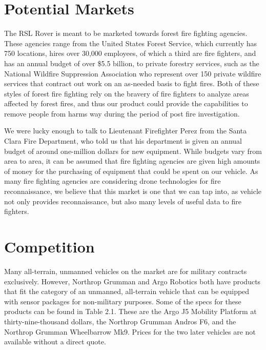 \section{Potential Markets}

The RSL Rover is meant to be marketed towards forest fire fighting agencies. These agencies range from the United States Forest Service, which currently has 750 locations, hires over 30,000 employees, of which a third are fire fighters, and has an annual budget of over \$5.5 billion, to private forestry services, such as the National Wildfire Suppression Association who represent over 150 private wildfire services that contract out work on an as-needed basis to fight fires. Both of these styles of forest fire fighting rely on the bravery of fire fighters to analyze areas affected by forest fires, and thus our product could provide the capabilities to remove people from harms way during the period of post fire investigation.

We were lucky enough to talk to Lieutenant Firefighter Perez from the Santa Clara Fire Department, who told us that his department is given an annual budget of around one-million dollars for new equipment. While budgets vary from area to area, it can be assumed that fire fighting agencies are given high amounts of money for the purchasing of equipment that could be spent on our vehicle. As many fire fighting agencies are considering drone technologies for fire reconnaissance, we believe that this market is one that we can tap into, as vehicle not only provides reconnaissance, but also many levels of useful data to fire fighters. 

\section{Competition}

Many all-terrain, unmanned vehicles on the market are for military contracts exclusively. However, Northrop Grumman and Argo Robotics both have products that fit the category of an unmanned, all-terrain vehicle that can be equipped with sensor packages for non-military purposes. Some of the specs for these products can be found in Table 2.1. These are the Argo J5 Mobility Platform at thirty-nine-thousand dollars, the Northrop Grumman Andros F6, and the Northrop Grumman Wheelbarrow Mk9. Prices for the two later vehicles are not available without a direct quote. 


